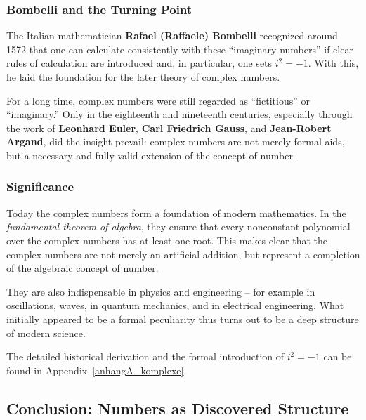 \subsubsection*{Bombelli and the Turning Point}
The Italian mathematician \textbf{Rafael (Raffaele) Bombelli}
recognized around 1572
that one can calculate consistently with these ``imaginary numbers''
if clear rules of calculation are introduced and, in particular, one sets $i^2=-1$.
With this, he laid the foundation
for the later theory of complex numbers.

For a long time, complex numbers were still regarded as ``fictitious'' or ``imaginary.''
Only in the eighteenth and nineteenth centuries,
especially through the work of \textbf{Leonhard Euler},
\textbf{Carl Friedrich Gauss}, and
\textbf{Jean-Robert Argand},
did the insight prevail:
complex numbers are not merely formal aids,
but a necessary and fully valid extension of the concept of number.

\subsubsection*{Significance}
Today the complex numbers form a foundation of modern mathematics.
In the \emph{fundamental theorem of algebra},
they ensure that every nonconstant polynomial over the complex numbers
has at least one root.
This makes clear
that the complex numbers are not merely an artificial addition,
but represent a completion of the algebraic concept of number.

They are also indispensable in physics and engineering --
for example in oscillations, waves,
in quantum mechanics,
and in electrical engineering.
What initially appeared to be a formal peculiarity
thus turns out to be a deep structure of modern science.

The detailed historical derivation
and the formal introduction of $i^2=-1$
can be found in Appendix~\ref{anhangA_komplexe}.


\subsection{Conclusion: Numbers as Discovered Structure}

